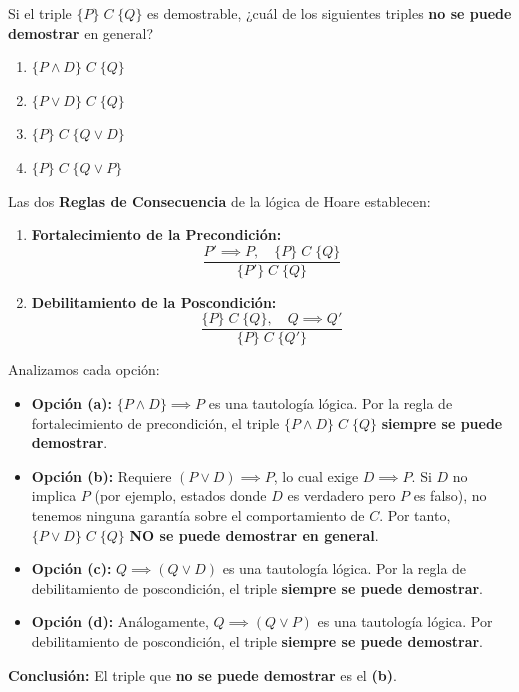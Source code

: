 \begin{ejercicio}
Si el triple $\{P\} \; C \; \{Q\}$ es demostrable, ¿cuál de los siguientes triples \textbf{no se puede demostrar} en general?
\begin{enumerate}[label=(\alph*),leftmargin=*]
    \item $\{P \land D\} \; C \; \{Q\}$
    \item $\{P \lor D\} \; C \; \{Q\}$
    \item $\{P\} \; C \; \{Q \lor D\}$
    \item $\{P\} \; C \; \{Q \lor P\}$
\end{enumerate}
\end{ejercicio}

\begin{solucion}
Las dos \textbf{Reglas de Consecuencia} de la lógica de Hoare establecen:
\begin{enumerate}
    \item \textbf{Fortalecimiento de la Precondición:}
    \[
    \frac{P' \implies P, \quad \{P\} \; C \; \{Q\}}{\{P'\} \; C \; \{Q\}}
    \]
    \item \textbf{Debilitamiento de la Poscondición:}
    \[
    \frac{\{P\} \; C \; \{Q\}, \quad Q \implies Q'}{\{P\} \; C \; \{Q'\}}
    \]
\end{enumerate}

Analizamos cada opción:
\begin{itemize}[leftmargin=*]
    \item \textbf{Opción (a):} $\{P \land D\} \implies P$ es una tautología lógica. Por la regla de fortalecimiento de precondición, el triple $\{P \land D\} \; C \; \{Q\}$ \textbf{siempre se puede demostrar}.
    \item \textbf{Opción (b):} Requiere $(P \lor D) \implies P$, lo cual exige $D \implies P$. Si $D$ no implica $P$ (por ejemplo, estados donde $D$ es verdadero pero $P$ es falso), no tenemos ninguna garantía sobre el comportamiento de $C$. Por tanto, $\{P \lor D\} \; C \; \{Q\}$ \textbf{NO se puede demostrar en general}.
    \item \textbf{Opción (c):} $Q \implies (Q \lor D)$ es una tautología lógica. Por la regla de debilitamiento de poscondición, el triple \textbf{siempre se puede demostrar}.
    \item \textbf{Opción (d):} Análogamente, $Q \implies (Q \lor P)$ es una tautología lógica. Por debilitamiento de poscondición, el triple \textbf{siempre se puede demostrar}.
\end{itemize}

\textbf{Conclusión:} El triple que \textbf{no se puede demostrar} es el \textbf{(b)}.
\end{solucion}

